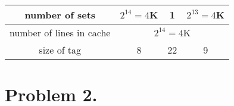 \documentclass[11pt]{article}  %
\begin{document}
\begin{table}[H]
\begin{tabular}{|c|ccc|}
    number of sets                  & \multicolumn{1}{c|}{$2^{14} = 4$K}                                              & \multicolumn{1}{c|}{1}                                                                           & $2^{13} = 4$K                                                        \\ \hline
    number of lines in cache        & \multicolumn{3}{c|}{$2^{14} = 4$K}                                                                                                                                                                                                                                     \\ \hline
    size of tag                     & \multicolumn{1}{c|}{8}                                                                       & \multicolumn{1}{c|}{22}                                                                          & 9                                                                                 \\ \hline
    \end{tabular}
\end{table}


\section*{Problem 2. }
\end{document}
